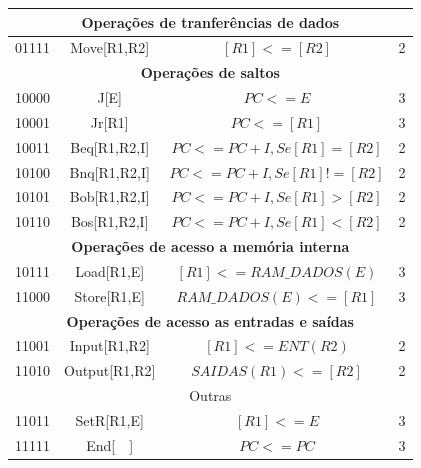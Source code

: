 \begin{table}[!htb]
\begin{tabular}{|c|c|c|c|}
\hline
\multicolumn{4}{|c|}{\textbf{Operações de tranferências de dados}}\\
\hline

01111 & Move[R1,R2] & $[R1]<=[R2]$ & 2\\

\hline
\multicolumn{4}{|c|}{\textbf{Operações de saltos}}\\
\hline

10000 & J[E]         & $PC<=E$                       & 3\\
\hline 
10001 & Jr[R1]       & $PC<=[R1]$                    & 3\\
\hline 
10011 & Beq[R1,R2,I] & $PC<=PC + I, Se [R1] = [R2]$  & 2\\
\hline 
10100 & Bnq[R1,R2,I] & $PC<=PC + I, Se [R1] != [R2]$ & 2\\
\hline 
10101 & Bob[R1,R2,I] & $PC<=PC + I, Se [R1] > [R2]$  & 2\\
\hline 
10110 & Bos[R1,R2,I] & $PC<=PC + I, Se [R1] < [R2]$  & 2\\


\hline
\multicolumn{4}{|c|}{\textbf{Operações de acesso a memória interna}}\\
\hline

10111 & Load[R1,E]  & $[R1]<=RAM\_DADOS(E)$ & 3\\
\hline 
11000 & Store[R1,E] & $RAM\_DADOS(E)<=[R1]$ & 3\\

\hline
\multicolumn{4}{|c|}{\textbf{Operações de acesso as entradas e saídas}}\\
\hline

11001 & Input[R1,R2]  & $[R1]<=ENT(R2)$    & 2\\
\hline 
11010 & Output[R1,R2] & $SAIDAS(R1)<=[R2]$ & 2\\

\hline
\multicolumn{4}{|c|}{Outras}\\
\hline

11011 & SetR[R1,E] & $[R1]<=E$ & 3\\
\hline
11111 & End[\ \ ]      & $PC<=PC $ & 3\\
\hline

\end{tabular}

\end{table}


\clearpage